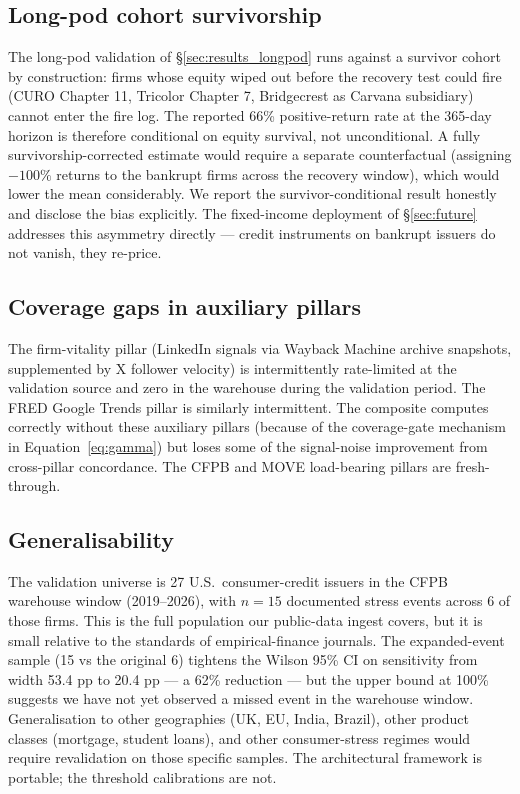 \documentclass[11pt,a4paper]{article}
\begin{document}
\subsection{Long-pod cohort survivorship}\label{sec:lim_longpod}

The long-pod validation of §\ref{sec:results_longpod} runs against a survivor cohort by construction: firms whose equity wiped out before the recovery test could fire (CURO Chapter 11, Tricolor Chapter 7, Bridgecrest as Carvana subsidiary) cannot enter the fire log. The reported 66\% positive-return rate at the 365-day horizon is therefore conditional on equity survival, not unconditional. A fully survivorship-corrected estimate would require a separate counterfactual (assigning $-100\%$ returns to the bankrupt firms across the recovery window), which would lower the mean considerably. We report the survivor-conditional result honestly and disclose the bias explicitly. The fixed-income deployment of §\ref{sec:future} addresses this asymmetry directly --- credit instruments on bankrupt issuers do not vanish, they re-price.

\subsection{Coverage gaps in auxiliary pillars}

The firm-vitality pillar (LinkedIn signals via Wayback Machine archive snapshots, supplemented by X follower velocity) is intermittently rate-limited at the validation source and zero in the warehouse during the validation period. The FRED Google Trends pillar is similarly intermittent. The composite computes correctly without these auxiliary pillars (because of the coverage-gate mechanism in Equation~\ref{eq:gamma}) but loses some of the signal-noise improvement from cross-pillar concordance. The CFPB and MOVE load-bearing pillars are fresh-through.

\subsection{Generalisability}

The validation universe is 27 U.S.\ consumer-credit issuers in the CFPB warehouse window (2019--2026), with $n=15$ documented stress events across 6 of those firms. This is the full population our public-data ingest covers, but it is small relative to the standards of empirical-finance journals. The expanded-event sample (15 vs the original 6) tightens the Wilson 95\% CI on sensitivity from width 53.4 pp to 20.4 pp --- a 62\% reduction --- but the upper bound at 100\% suggests we have not yet observed a missed event in the warehouse window. Generalisation to other geographies (UK, EU, India, Brazil), other product classes (mortgage, student loans), and other consumer-stress regimes would require revalidation on those specific samples. The architectural framework is portable; the threshold calibrations are not.
\end{document}
